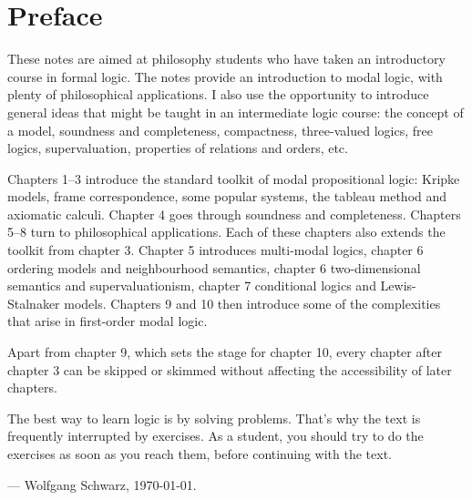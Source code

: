 \chapter*{Preface}\label{ch:preface}

These notes are aimed at philosophy students who have taken an introductory
course in formal logic. The notes provide an introduction to modal logic, with
plenty of philosophical applications. I also use the opportunity to introduce
general ideas that might be taught in an intermediate logic course: the concept
of a model, soundness and completeness, compactness, three-valued logics, free
logics, supervaluation, properties of relations and orders, etc.

Chapters 1--3 introduce the standard toolkit of modal propositional logic:
Kripke models, frame correspondence, some popular systems, the tableau method
and axiomatic calculi. Chapter 4 goes through soundness and completeness.
Chapters 5--8 turn to philosophical applications. Each of these chapters also
extends the toolkit from chapter 3. Chapter 5 introduces multi-modal logics,
chapter 6 ordering models and neighbourhood semantics, chapter 6 two-dimensional
semantics and supervaluationism, chapter 7 conditional logics and
Lewis-Stalnaker models. Chapters 9 and 10 then introduce some of the
complexities that arise in first-order modal logic.

Apart from chapter 9, which sets the stage for chapter 10, every chapter after
chapter 3 can be skipped or skimmed without affecting the accessibility of later
chapters.

The best way to learn logic is by solving problems. That's why the text is
frequently interrupted by exercises. As a student, you should try to do the
exercises as soon as you reach them, before continuing with the text.

\bigskip
--- Wolfgang Schwarz, \today.







